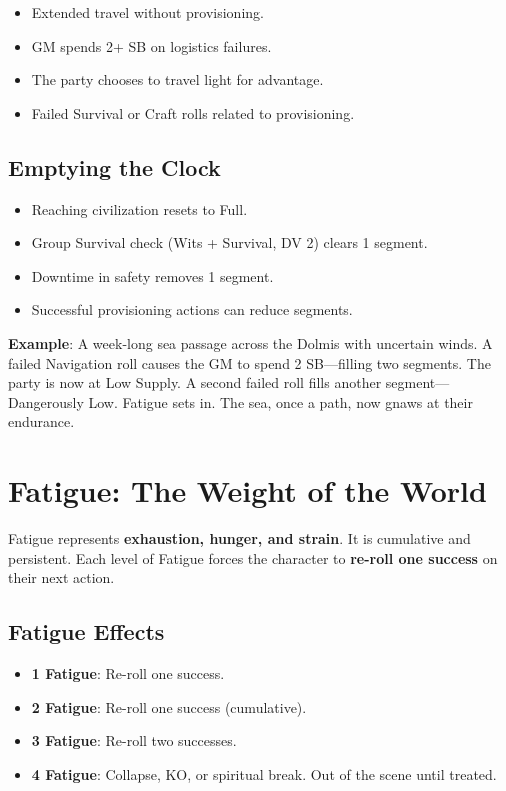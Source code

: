 \begin{itemize}
    \item Extended travel without provisioning.
    \item GM spends 2+ SB on logistics failures.
    \item The party chooses to travel light for advantage.
    \item Failed Survival or Craft rolls related to provisioning.
\end{itemize}

\subsection*{Emptying the Clock}

\begin{itemize}
    \item Reaching civilization resets to Full.
    \item Group Survival check (Wits + Survival, DV 2) clears 1 segment.
    \item Downtime in safety removes 1 segment.
    \item Successful provisioning actions can reduce segments.
\end{itemize}

\textbf{Example}: A week-long sea passage across the Dolmis with uncertain winds. A failed Navigation roll causes the GM to spend 2 SB---filling two segments. The party is now at Low Supply. A second failed roll fills another segment---Dangerously Low. Fatigue sets in. The sea, once a path, now gnaws at their endurance.

\section*{Fatigue: The Weight of the World}

Fatigue represents \textbf{exhaustion, hunger, and strain}. It is cumulative and persistent. Each level of Fatigue forces the character to \textbf{re-roll one success} on their next action.

\subsection*{Fatigue Effects}

\begin{itemize}
    \item \textbf{1 Fatigue}: Re-roll one success.
    \item \textbf{2 Fatigue}: Re-roll one success (cumulative).
    \item \textbf{3 Fatigue}: Re-roll two successes.
    \item \textbf{4 Fatigue}: Collapse, KO, or spiritual break. Out of the scene until treated.
\end{itemize}

